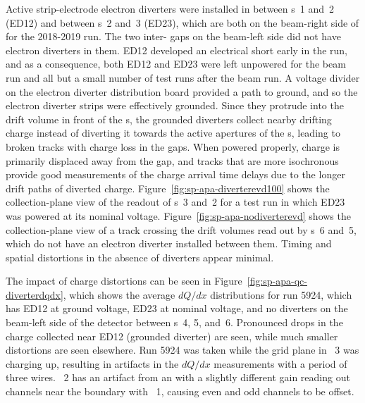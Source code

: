 Active strip-electrode electron diverters were installed in  between s~1 and~2 (ED12) 
and between s~2 and~3 (ED23), which are both on the beam-right side of  for 
the 2018-2019 run.  The two inter- gaps on the beam-left side did not have electron diverters in them. ED12 developed an electrical short early in the run, and as a consequence, both ED12 and ED23 were left unpowered for the beam run and all but a small number of test runs after the beam run.  A voltage divider on the electron diverter  distribution board provided a path to ground, and so the electron diverter strips were effectively grounded.  Since they protrude into the drift volume in front of the s, the grounded diverters collect nearby drifting charge instead of diverting it towards the active apertures of the s, %
leading to broken tracks with charge loss in the gaps.  When powered properly, charge is primarily displaced away from the gap, and tracks that are more isochronous provide good measurements of the charge arrival time delays due to the longer drift paths of diverted charge. Figure~\ref{fig:sp-apa-diverterevd100} shows the collection-plane view of the readout of s~3 and~2 for a test run in which ED23 was powered at its nominal voltage. Figure~\ref{fig:sp-apa-nodiverterevd} shows the collection-plane view of a track crossing the drift volumes read out by s~6 and~5, which do not have an electron diverter installed between them.  Timing and spatial distortions in the absence of diverters appear minimal.

The impact of charge distortions can be seen in Figure~\ref{fig:sp-apa-qc-diverterdqdx}, which shows the average $dQ/dx$ distributions for  run 5924, which has ED12 at ground voltage, ED23 at nominal voltage, and no diverters on the beam-left side of the detector between s~4, 5, and~6.  Pronounced drops in the charge collected near ED12 (grounded diverter) are seen, while much smaller distortions are seen elsewhere.  Run 5924 was taken while the grid plane in ~3 was charging up, resulting in artifacts in the $dQ/dx$ measurements with a period of three wires.  ~2 has an artifact from an  with a slightly different gain reading out channels near the boundary with ~1, causing even and odd channels to be offset.

